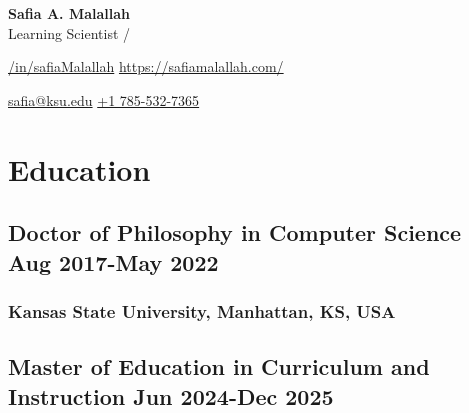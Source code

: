 \documentclass[11pt]{article}
\begin{document}
\begin{center}      
    {\fontsize{28}{28}\selectfont \textbf{ Safia A. Malallah}} \\ \bigskip
     {\fontsize{16}{16}\selectfont  {\color{icnclr}\faLessThan[regular]}  Learning Scientist /  {\color{icnclr}\faGreaterThan[regular]}  } \\ 
\end{center}
\begin{center}   
    {\color{icnclr}\faLinkedin[regular]} \href{https://www.linkedin.com/in/safiaMalallah}{/in/safiaMalallah} 
       \quad
   {\color{icnclr}\faGlobe[regular]} \href{https://safiamalallah.com/}{https://safiamalallah.com/}
     
    \quad
      {\color{icnclr}\faEnvelope[regular]} \href{mailto:safia@ksu.edu}{safia@ksu.edu} 
       \quad
    {\color{icnclr}} \href{tel:+1 4065808118}{+1 785-532-7365} 
\end{center}

\section{Education}



\vspace{0.8em} %

\subsection{Doctor of Philosophy in Computer Science  \hfill \normalfont Aug 2017-May 2022}  
\subsubsection{Kansas State University,  Manhattan, KS, USA}
\vspace{0.8em} %

\subsection{Master of Education in Curriculum and Instruction \hfill \normalfont Jun 2024-Dec 2025}  
\end{document}
